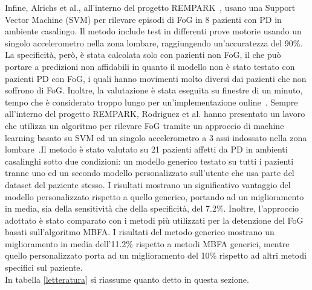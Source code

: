 Infine, Alrichs et al., all'interno del progetto REMPARK~\cite{55}, usano una Support Vector Machine (SVM) per rilevare episodi di FoG in 8 pazienti con PD in ambiente casalingo. Il metodo include test in differenti prove motorie usando un singolo accelerometro nella zona lombare, raggiungendo un'accuratezza del 90\%. La specificità, però, è stata calcolata solo con pazienti non FoG, il che può portare a predizioni non affidabili in quanto il modello non è stato testato con pazienti PD con FoG, i quali hanno movimenti molto diversi dai pazienti che non soffrono di FoG. Inoltre, la valutazione è stata eseguita su finestre di un minuto, tempo che è considerato troppo lungo per un'implementazione online~\cite{28}. Sempre all'interno del progetto REMPARK, Rodriguez et al. hanno presentato un lavoro che utilizza un algoritmo per rilevare FoG tramite un approccio di machine learning basato su SVM ed un singolo accelerometro a 3 assi indossato nella zona lombare~\cite{HD}.Il metodo è stato valutato su 21 pazienti affetti da PD in ambienti casalinghi sotto due condizioni: un modello generico testato su tutti i pazienti tranne uno ed un secondo modello personalizzato sull'utente che usa parte del dataset del paziente stesso. I risultati mostrano un significativo vantaggio del modello personalizzato rispetto a quello generico, portando ad un miglioramento in media, sia della sensitività che della specificità, del 7.2\%. Inoltre, l'approccio adottato è stato comparato con i metodi più utilizzati per la detenzione del FoG basati sull'algoritmo MBFA. I risultati del metodo generico mostrano un miglioramento in media dell'11.2\% rispetto a metodi MBFA generici, mentre quello personalizzato porta ad un miglioramento del 10\% rispetto ad altri metodi specifici sul paziente.\\
In tabella \ref{letteratura} si riassume quanto detto in questa sezione.
